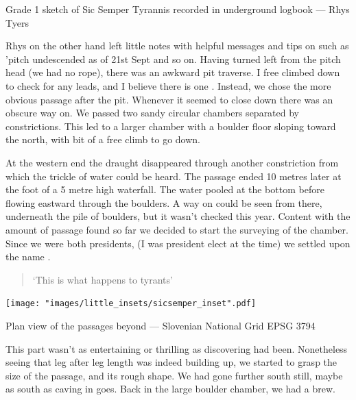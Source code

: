 \begin{survey}[t!]
\checkoddpage \ifoddpage \forcerectofloat \else \forceversofloat \fi
\centering
{}
\caption[Sic Semper Tyrannis (Grade 1)]{Grade 1 sketch of Sic Semper Tyrannis recorded in underground logbook --- Rhys Tyers}
\label{G1 sketch}
\end{survey}

Rhys on the other hand left little notes with helpful messages and tips on such as 'pitch undescended as of 21st Sept and so on. Having turned left from the pitch head (we had no rope), there was an awkward pit traverse. I free climbed down to check for any leads, and I believe there is one \sidenote. Instead, we chose the more obvious passage after the pit. Whenever it seemed to close down there was an obscure way on. We passed two sandy circular chambers separated by constrictions. This led to a larger chamber with a boulder floor sloping toward the north, with bit of a free climb to go down. 

At the western end the draught disappeared through another constriction from which the trickle of water could be heard. The passage ended 10 metres later at the foot of a 5 metre high waterfall. The water pooled at the bottom before flowing eastward through the boulders. A way on could be seen from there, underneath the pile of boulders, but it wasn't checked this year. Content with the amount of passage found so far we decided to start the surveying of the chamber. Since we were both presidents, (I was president elect at the time) we settled upon the name . 
\begin{quote}`This is what happens to tyrants' \end{quote}

\begin{marginsurvey}
	\texttt{[image: "images/little\_insets/sicsemper\_inset".pdf]}
	\caption[Sic Semper Tyrannis]{Plan view of the \protect{} passages beyond \protect{} --- Slovenian National Grid EPSG 3794}
\end{marginsurvey}


This part wasn't as entertaining or thrilling as discovering had been. Nonetheless seeing that leg after leg length was indeed building up, we started to grasp the size of the passage, and its rough shape. We had gone further south still, maybe as south as caving in  goes. Back in the large boulder chamber, we had a brew.

